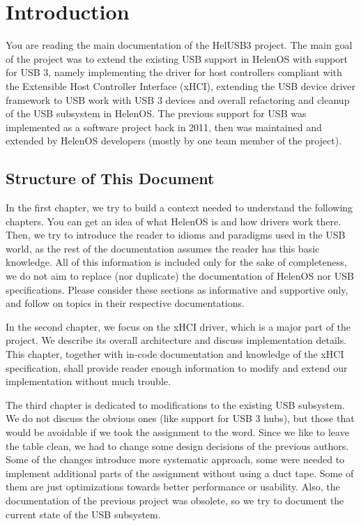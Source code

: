 \chapter{Introduction}

You are reading the main documentation of the HelUSB3 project. The main goal of
the project was to extend the existing USB support in HelenOS with support for
USB 3, namely implementing the driver for host controllers compliant with the
Extensible Host Controller Interface (xHCI), extending the USB device driver
framework to USB work with USB 3 devices and overall refactoring and cleanup of
the USB subsystem in HelenOS. The previous support for USB was implemented as
a software project back in 2011, then was maintained and extended by HelenOS
developers (mostly by one team member of the project).

\section{Structure of This Document}

In the first chapter, we try to build a context needed to understand the
following chapters. You can get an idea of what HelenOS is and how drivers work
there. Then, we try to introduce the reader to idioms and paradigms used in the
USB world, as the rest of the documentation assumes the reader has this basic
knowledge. All of this information is included only for the sake of
completeness, we do not aim to replace (nor duplicate) the documentation of
HelenOS nor USB specifications. Please consider these sections as informative
and supportive only, and follow on topics in their respective documentations.

In the second chapter, we focus on the xHCI driver, which is a major part of
the project. We describe its overall architecture and discuss implementation
details. This chapter, together with in-code documentation and knowledge of the
xHCI specification, shall provide reader enough information to modify and
extend our implementation without much trouble.

The third chapter is dedicated to modifications to the existing USB subsystem.
We do not discuss the obvious ones (like support for USB 3 hubs), but those
that would be avoidable if we took the assignment to the word. Since we like to
leave the table clean, we had to change some design decisions of the previous
authors. Some of the changes introduce more systematic approach, some were
needed to implement additional parts of the assignment without using a duct
tape. Some of them are just optimizations towards better performance or
usability. Also, the documentation of the previous project was obsolete, so we
try to document the current state of the USB subsystem.


